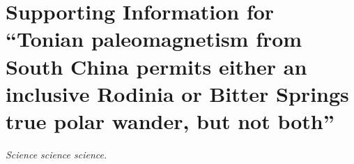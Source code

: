 \chapter[Supporting Information for ``Tonian paleomagnetism from South China permits either an inclusive Rodinia or Bitter Springs true polar wander, but not both''][Supporting Information - Xiajiang Group]{Supporting Information for ``Tonian paleomagnetism from South China permits either an inclusive Rodinia or Bitter Springs true polar wander, but not both''}

\textit{Science science science.}